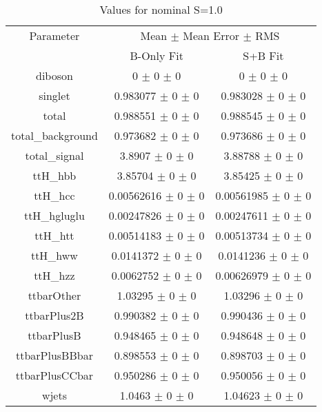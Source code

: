 \begin{table}
\centering
\caption{Values for nominal S=1.0}
\begin{tabular}{ccc}
\toprule
Parameter 	& \multicolumn{2}{c}{Mean $\pm$ Mean Error $\pm$ RMS}\\
 	& B-Only Fit & S+B Fit\\
\midrule
diboson 	& \num{0} $\pm$ \num{0} $\pm$ \num{0} 	& \num{0} $\pm$ \num{0} $\pm$ \num{0}\\
singlet 	& \num{0.983077} $\pm$ \num{0} $\pm$ \num{0} 	& \num{0.983028} $\pm$ \num{0} $\pm$ \num{0}\\
total 	& \num{0.988551} $\pm$ \num{0} $\pm$ \num{0} 	& \num{0.988545} $\pm$ \num{0} $\pm$ \num{0}\\
total\_background 	& \num{0.973682} $\pm$ \num{0} $\pm$ \num{0} 	& \num{0.973686} $\pm$ \num{0} $\pm$ \num{0}\\
total\_signal 	& \num{3.8907} $\pm$ \num{0} $\pm$ \num{0} 	& \num{3.88788} $\pm$ \num{0} $\pm$ \num{0}\\
ttH\_hbb 	& \num{3.85704} $\pm$ \num{0} $\pm$ \num{0} 	& \num{3.85425} $\pm$ \num{0} $\pm$ \num{0}\\
ttH\_hcc 	& \num{0.00562616} $\pm$ \num{0} $\pm$ \num{0} 	& \num{0.00561985} $\pm$ \num{0} $\pm$ \num{0}\\
ttH\_hgluglu 	& \num{0.00247826} $\pm$ \num{0} $\pm$ \num{0} 	& \num{0.00247611} $\pm$ \num{0} $\pm$ \num{0}\\
ttH\_htt 	& \num{0.00514183} $\pm$ \num{0} $\pm$ \num{0} 	& \num{0.00513734} $\pm$ \num{0} $\pm$ \num{0}\\
ttH\_hww 	& \num{0.0141372} $\pm$ \num{0} $\pm$ \num{0} 	& \num{0.0141236} $\pm$ \num{0} $\pm$ \num{0}\\
ttH\_hzz 	& \num{0.0062752} $\pm$ \num{0} $\pm$ \num{0} 	& \num{0.00626979} $\pm$ \num{0} $\pm$ \num{0}\\
ttbarOther 	& \num{1.03295} $\pm$ \num{0} $\pm$ \num{0} 	& \num{1.03296} $\pm$ \num{0} $\pm$ \num{0}\\
ttbarPlus2B 	& \num{0.990382} $\pm$ \num{0} $\pm$ \num{0} 	& \num{0.990436} $\pm$ \num{0} $\pm$ \num{0}\\
ttbarPlusB 	& \num{0.948465} $\pm$ \num{0} $\pm$ \num{0} 	& \num{0.948648} $\pm$ \num{0} $\pm$ \num{0}\\
ttbarPlusBBbar 	& \num{0.898553} $\pm$ \num{0} $\pm$ \num{0} 	& \num{0.898703} $\pm$ \num{0} $\pm$ \num{0}\\
ttbarPlusCCbar 	& \num{0.950286} $\pm$ \num{0} $\pm$ \num{0} 	& \num{0.950056} $\pm$ \num{0} $\pm$ \num{0}\\
wjets 	& \num{1.0463} $\pm$ \num{0} $\pm$ \num{0} 	& \num{1.04623} $\pm$ \num{0} $\pm$ \num{0}\\
\bottomrule
\end{tabular}
\end{table}